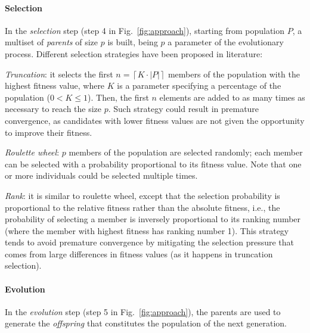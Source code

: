 \begin{tikzborder}{\cite{Gargantini16:validation}}
\begin{tikzborder}{\cite{gargantini_combinatorial_2017}}
\begin{tikzborder}{\cite{gargantini_combinatorial_2017}}
\begin{tikzborder}{\cite{garn2019}}
\begin{tikzborder}{\cite{arcaini2019achieving}}
	\paragraph{\bf Selection}%
	\bb In the \emph{selection} step (step 4 in Fig.~\ref{fig:approach}), starting from population $P$, a multiset of \emph{parents} \PAR of size $p$ is built, being $p$ a parameter of the evolutionary process. Different selection strategies have been proposed in literature:
	\begin{compactitem}
		\item \emph{Truncation}: it selects the first $n = \left\lceil K\cdot|P| \right\rceil$ members of the population with the highest fitness value, where $K$ is a parameter specifying a percentage of the population ($0 < K \le 1$). Then, the first $n$ elements are added to \PAR as many times as necessary to reach the size $p$. Such strategy could result in premature convergence, as candidates with lower fitness values are not given the opportunity to improve their fitness.
		\item \emph{Roulette wheel}: $p$ members of the population are selected randomly; each member can be selected with a probability proportional to its fitness value. Note that one or more individuals could be selected multiple times.
		\item \emph{Rank}: it is similar to roulette wheel, except that the selection probability is proportional to the relative fitness rather than the absolute fitness, i.e., the probability of selecting a member is inversely proportional to its ranking number (where the member with highest fitness has ranking number 1). This strategy tends to avoid premature convergence by mitigating the selection pressure that comes from large differences in fitness values (as it happens in truncation selection).
	\end{compactitem}\be
	
	\paragraph{\bf Evolution}%
	\bb In the \emph{evolution} step (step 5 in Fig.~\ref{fig:approach}), the parents \PAR are used to generate the \emph{offspring} that constitutes the population of the next generation.
	

\end{tikzborder}
\end{tikzborder}
\end{tikzborder}
\end{tikzborder}
\end{tikzborder}

